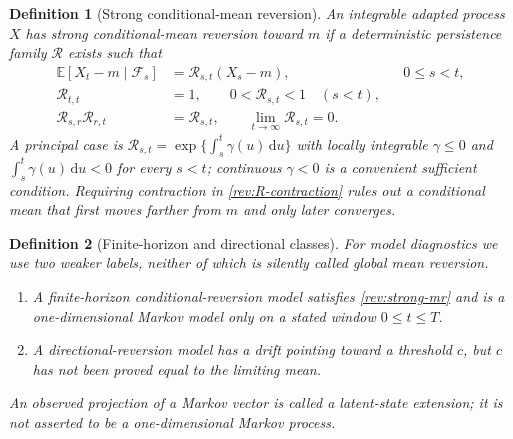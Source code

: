 \documentclass[11pt]{article}
\newtheorem{definition}{Definition}[section]
\theoremstyle{remark}
\newcommand{\E}{\mathbb E}
\newcommand{\dd}{\,\mathrm d}
\begin{document}
\begin{definition}[Strong conditional-mean reversion]
\label{rev:def-strong-mr}
An integrable adapted process $X$ has \emph{strong conditional-mean reversion}
toward $m$ if a deterministic persistence family $\mathcal R$ exists such that
\begin{align}
\E[X_t-m\mid\mathcal F_s]&=\mathcal R_{s,t}(X_s-m),
      &&0\le s<t,\label{rev:strong-mr}\\
\mathcal R_{t,t}&=1,\qquad 0<\mathcal R_{s,t}<1\quad(s<t),
\label{rev:R-contraction}\\
\mathcal R_{s,r}\mathcal R_{r,t}&=\mathcal R_{s,t},\qquad
\lim_{t\to\infty}\mathcal R_{s,t}=0.\label{rev:R-properties}
\end{align}
A principal case is
$\mathcal R_{s,t}=\exp\{\int_s^t\gamma(u)\dd u\}$ with locally integrable
$\gamma\leq0$ and $\int_s^t\gamma(u)\dd u<0$ for every $s<t$; continuous
$\gamma<0$ is a convenient sufficient condition.  Requiring contraction in
\eqref{rev:R-contraction} rules out a conditional mean that first moves farther
from $m$ and only later converges.
\end{definition}

\begin{definition}[Finite-horizon and directional classes]
\label{rev:def-auxiliary-classes}
For model diagnostics we use two weaker labels, neither of which is silently
called global mean reversion.
\begin{enumerate}[label=(\roman*)]
\item A \emph{finite-horizon conditional-reversion model} satisfies
\eqref{rev:strong-mr} and is a one-dimensional Markov model only on a stated
window $0\le t\le T$.
\item A \emph{directional-reversion model} has a drift pointing toward a
threshold $c$, but $c$ has not been proved equal to the limiting mean.
\end{enumerate}
An observed projection of a Markov vector is called a \emph{latent-state
extension}; it is not asserted to be a one-dimensional Markov process.
\end{definition}
\end{document}
